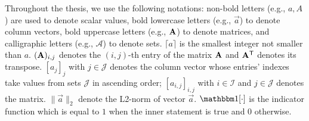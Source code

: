 Throughout the thesis, we use the following notations:
non-bold letters (e.g., $a, A$) are used to denote scalar values,
bold lowercase letters (e.g., $\vec{a}$) to denote column vectors,
bold uppercase letters (e.g., $\mathbf{A}$) to denote matrices,
and calligraphic letters (e.g., $\mathcal{A}$) to denote sets.
$\lceil a \rceil$ is the smallest integer not smaller than $a$.
$(\mathbf{A})_{i,j}$ denotes the $(i,j)$-th entry of the matrix $\mathbf{A}$ and $\mathbf{A}^\mathsf{T}$ denotes its transpose.
$[a_{j}]_{j}$ with $j\in \mathcal{J}$ denotes the column vector whose entries' indexes take values from sets $\mathcal{J}$ in ascending order; $[a_{i,j}]_{i,j}$ with $i\in \mathcal{I}$ and  $j\in \mathcal{J}$ denotes the matrix.
$\|{\vec{a}}\|_2$ denote the L2-norm of vector $\vec{a}$.
$\indicator[\cdot]$ is the indicator function which is equal to $1$ when the inner statement is true and $0$ otherwise.
